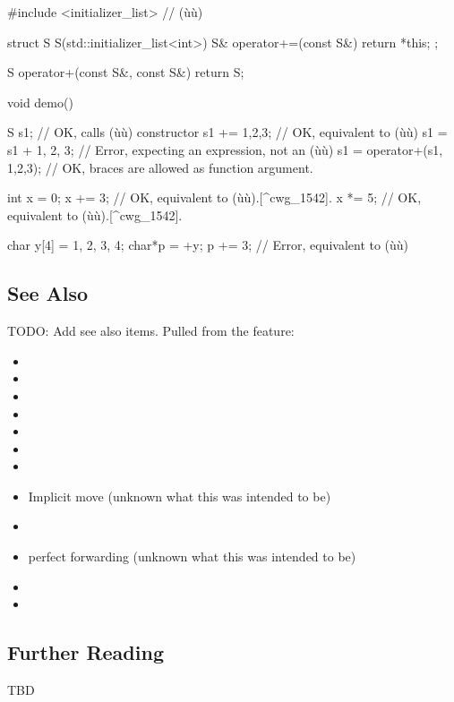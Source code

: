 \begin{emcppslisting}
#include <initializer_list>  // (ù{}ù)

struct S
{
    S(std::initializer_list<int>) { }
    S& operator+=(const S&) { return *this; }
};

S operator+(const S&, const S&) { return S{}; }

void demo()
{
    S s1{};               // OK, calls (ù{}ù) constructor
    s1 += {1,2,3};        // OK, equivalent to (ù{}ù)
    s1 = s1 + {1, 2, 3};  // Error, expecting an expression, not an (ù{}ù)
    s1 = operator+(s1, {1,2,3}); // OK, braces are allowed as function argument.

    int x = 0;
    x += {3};    // OK, equivalent to (ù{}ù).[^cwg_1542].
    x *= {5};    // OK, equivalent to (ù{}ù).[^cwg_1542].

    char y[4] = {1, 2, 3, 4};
    char*p = +y;
    p += {3};    // Error,  equivalent to (ù{}ù)
}
\end{emcppslisting}
    

\subsection[See Also]{See Also}\label{see-also}

TODO: Add see also items. Pulled from the feature:
\begin{itemize}
\item{}
\item{}
\item{}
\item{}
\item{}
\item{}
\item{}
\item{Implicit move (unknown what this was intended to be)}
\item{}
\item{perfect forwarding (unknown what this was intended to be) }
\item{}
\item{}
\end{itemize}

\subsection[Further Reading]{Further Reading}\label{further-reading}

TBD


